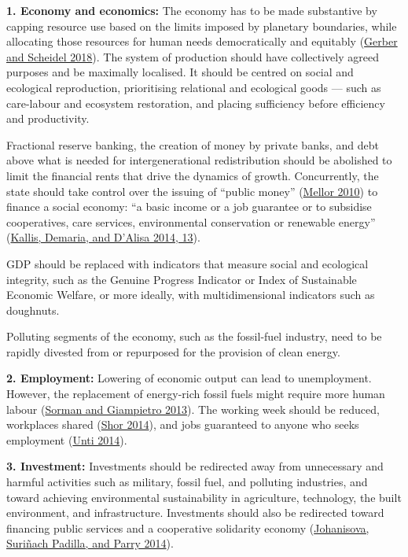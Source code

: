 \documentclass[a4paper, nobind]{templates/ociamthesis}
\begin{document}
\textbf{1. Economy and economics:} The economy has to be made substantive by capping resource use based on the limits imposed by planetary boundaries, while allocating those resources for human needs democratically and equitably (\protect\hyperlink{ref-gerber_search_2018}{Gerber and Scheidel 2018}). The system of production should have collectively agreed purposes and be maximally localised. It should be centred on social and ecological reproduction, prioritising relational and ecological goods --- such as care-labour and ecosystem restoration, and placing sufficiency before efficiency and productivity.

Fractional reserve banking, the creation of money by private banks, and debt above what is needed for intergenerational redistribution should be abolished to limit the financial rents that drive the dynamics of growth. Concurrently, the state should take control over the issuing of ``public money'' (\protect\hyperlink{ref-mellor_future_2010}{Mellor 2010}) to finance a social economy: ``a basic income or a job guarantee or to subsidise cooperatives, care services, environmental conservation or renewable energy'' (\protect\hyperlink{ref-kallis_introduction_2014}{Kallis, Demaria, and D'Alisa 2014, 13}).

GDP should be replaced with indicators that measure social and ecological integrity, such as the Genuine Progress Indicator or Index of Sustainable Economic Welfare, or more ideally, with multidimensional indicators such as doughnuts.

Polluting segments of the economy, such as the fossil-fuel industry, need to be rapidly divested from or repurposed for the provision of clean energy.

\textbf{2. Employment:} Lowering of economic output can lead to unemployment. However, the replacement of energy-rich fossil fuels might require more human labour (\protect\hyperlink{ref-sorman_energetic_2013}{Sorman and Giampietro 2013}). The working week should be reduced, workplaces shared (\protect\hyperlink{ref-shor_work_2014}{Shor 2014}), and jobs guaranteed to anyone who seeks employment (\protect\hyperlink{ref-unti_job_2014}{Unti 2014}).

\textbf{3. Investment:} Investments should be redirected away from unnecessary and harmful activities such as military, fossil fuel, and polluting industries, and toward achieving environmental sustainability in agriculture, technology, the built environment, and infrastructure. Investments should also be redirected toward financing public services and a cooperative solidarity economy (\protect\hyperlink{ref-johanisova_co-operatives_2014}{Johanisova, Suriñach Padilla, and Parry 2014}).
\end{document}
